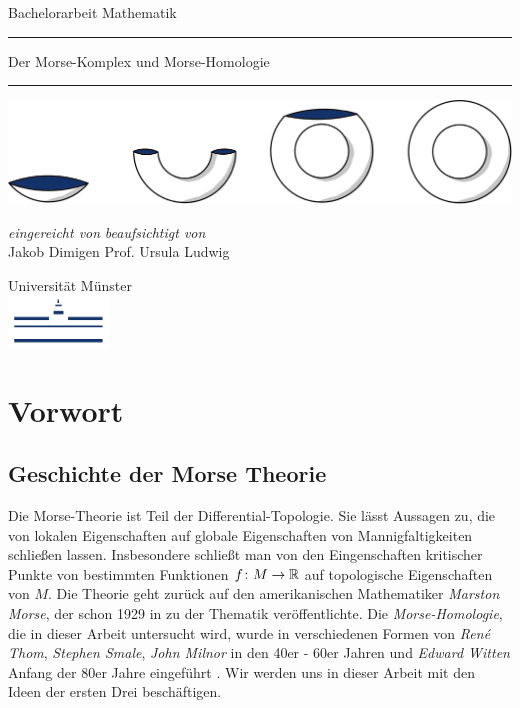 \documentclass[a4paper,11pt,twoside]{scrreport}
\begin{document}
\makeheaderempty

\begin{titlepage}
    \centering
    Bachelorarbeit Mathematik \\
    \color{DarkBlue}\rule{\linewidth}{1pt}
    \color{Black}\Huge Der Morse-Komplex und Morse-Homologie \\[14pt]
    \color{DarkBlue}\rule{\linewidth}{2pt}
    \color{Black}

    \vspace{3cm}
    \includegraphics[width=\textwidth]{../resources/Me-Titlepage-Color.jpeg}

    \vfill
    \small

    \textit{eingereicht von}
    \hfill
    \textit{beaufsichtigt von} \\
    Jakob Dimigen
    \hfill
    Prof. Ursula Ludwig

    \vspace{2cm}

    Universität Münster \\
    \vspace{0.02cm}
    \includegraphics[width=0.2\textwidth]{../resources/WWU_Logo.png}
\end{titlepage}

\section*{Vorwort}

\subsection*{Geschichte der Morse Theorie}

Die Morse-Theorie ist Teil der Differential-Topologie. Sie lässt Aussagen zu, die von lokalen 
Eigenschaften auf globale Eigenschaften von Mannigfaltigkeiten schließen lassen. Insbesondere schließt man
von den Eingenschaften kritischer Punkte von bestimmten Funktionen $f \colon M \to { \mathbb R }$ auf topologische 
Eigenschaften von $M$. 
Die Theorie geht zurück auf den amerikanischen Mathematiker \textit{Marston Morse}, 
der schon 1929 in \cite{morse} zu der Thematik veröffentlichte. Die \textit{Morse-Homologie}, die in dieser 
Arbeit untersucht wird, wurde in verschiedenen Formen von \textit{René Thom}, \textit{Stephen Smale},
\textit{John Milnor} in den 40er - 60er Jahren und \textit{Edward Witten} Anfang der 80er Jahre 
eingeführt \cite{yanfeng}. Wir werden uns in dieser Arbeit mit den Ideen der ersten Drei beschäftigen.
\end{document}
